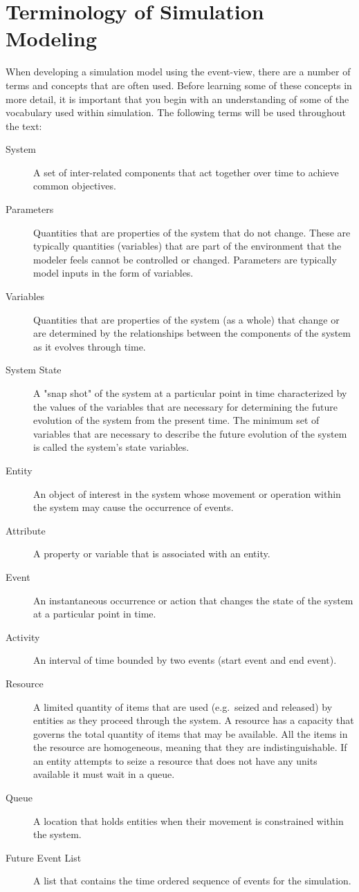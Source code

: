 \documentclass[
]{book}
\theoremstyle{definition}
\theoremstyle{definition}
\theoremstyle{definition}
\theoremstyle{definition}
\theoremstyle{remark}
\begin{document}
\hypertarget{terminology-of-simulation-modeling}{%
\section{Terminology of Simulation Modeling}\label{terminology-of-simulation-modeling}}

When developing a simulation model using the event-view, there are a number
of terms and concepts that are often used. Before learning some of these
concepts in more detail, it is important that you begin with an
understanding of some of the vocabulary used within simulation. The
following terms will be used throughout the text:

\begin{description}
\item[System]
A set of inter-related components that act together over time to
achieve common objectives.
\item[Parameters]
Quantities that are properties of the system that do not change.
These are typically quantities (variables) that are part of the
environment that the modeler feels cannot be controlled or changed.
Parameters are typically model inputs in the form of variables.
\item[Variables]
Quantities that are properties of the system (as a whole) that
change or are determined by the relationships between the components
of the system as it evolves through time.
\item[System State]
A "snap shot" of the system at a particular point in time
characterized by the values of the variables that are necessary for
determining the future evolution of the system from the present
time. The minimum set of variables that are necessary to describe
the future evolution of the system is called the system's state
variables.
\item[Entity]
An object of interest in the system whose movement or operation
within the system may cause the occurrence of events.
\item[Attribute]
A property or variable that is associated with an entity.
\item[Event]
An instantaneous occurrence or action that changes the state of the
system at a particular point in time.
\item[Activity]
An interval of time bounded by two events (start event and end
event).
\item[Resource]
A limited quantity of items that are used (e.g.~seized and released)
by entities as they proceed through the system. A resource has a
capacity that governs the total quantity of items that may be
available. All the items in the resource are homogeneous, meaning
that they are indistinguishable. If an entity attempts to seize a
resource that does not have any units available it must wait in a
queue.
\item[Queue]
A location that holds entities when their movement is constrained
within the system.
\item[Future Event List]
A list that contains the time ordered sequence of events for the
simulation.
\end{description}
\end{document}
